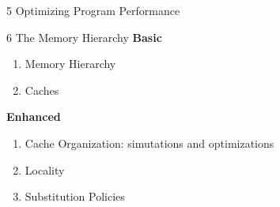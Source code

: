 \documentclass{beamer}
\begin{document}
\begin{frame}{5 Optimizing Program Performance}
	\only<1> {
	}
	 {
	}
\end{frame}


\begin{frame}{6 The Memory Hierarchy}
\textbf{Basic}
\begin{enumerate}
	\item Memory Hierarchy
	\item Caches
\end{enumerate}
\textbf{Enhanced}
\begin{enumerate}
	\item Cache Organization: simutations and optimizations
	\item Locality
	\item Substitution Policies
\end{enumerate}
\end{frame}
\end{document}

